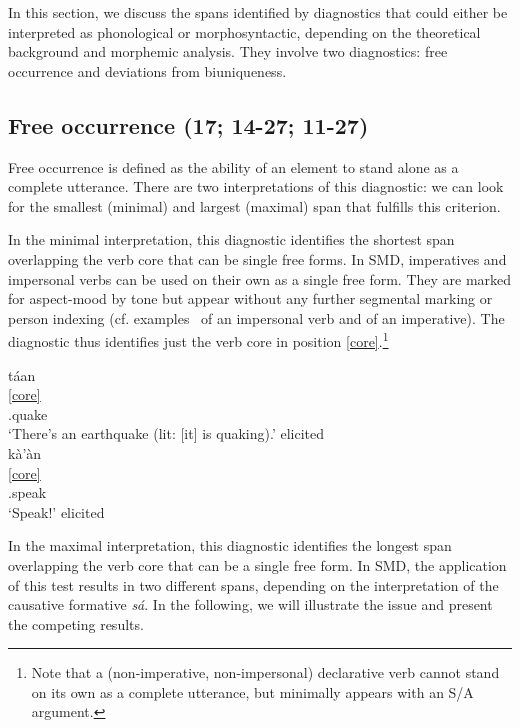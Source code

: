 \documentclass[output=paper]{langscibook}
\begin{document}
In this section, we discuss the spans identified by diagnostics that could either be interpreted as phonological or morphosyntactic, depending on the theoretical background and morphemic analysis. 
They involve two diagnostics: free occurrence and deviations from biuniqueness.


\subsection{Free occurrence (17; 14-27; 11-27)} %
\label{sub:freeocurrence}

Free occurrence is defined as the ability of an element to stand alone as a complete utterance. There are two interpretations of this diagnostic: we can look for the smallest (minimal) and largest (maximal) span that fulfills this criterion. 

In the minimal interpretation, this diagnostic identifies the shortest span overlapping the verb core that can be single free forms. 
In SMD, imperatives and impersonal verbs can be used on their own as a single free form. They are marked for aspect-mood by tone but appear without any further segmental marking or person indexing (cf. examples~ of an impersonal verb and  of an imperative).
The diagnostic thus identifies just the verb core in position \ref{core}.\footnote{Note that a (non-imperative, non-impersonal) declarative verb cannot stand on its own as a complete utterance, but minimally appears with an S/A argument.}

\ea
 \ea \label{ex:minimalfreeimps}
	\glll táan	\\
	    \ref{core} \\
		\Incmpl.quake		\\
	\glt `There's an earthquake (lit: [it] is quaking).' \hfill elicited \\
 \ex \label{ex:minimalfreeimp}
	\glll kà'àn	\\
		\ref{core} \\	
		\Pot.speak		\\
	\glt `Speak!' \hfill elicited \\
 \z
\z
	

In the maximal interpretation, this diagnostic identifies the longest span overlapping the verb core that can be a single free form. 
In SMD, the application of this test results in two different spans, depending on the interpretation of the causative formative \emph{sá}. In the following, we will illustrate the issue and present the competing results. 
\end{document}
